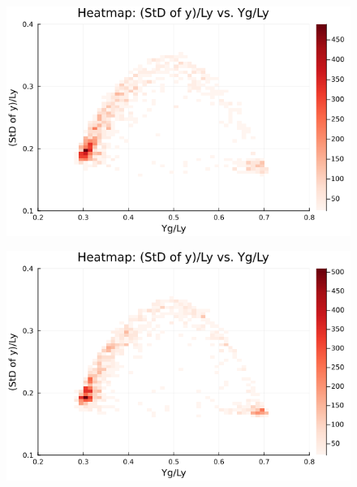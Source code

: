 \begin{figure}[H]
  \centering
  \includegraphics[scale=0.6]{image/RaRtmap10_heat/2023-12-28T12:38:52.075_map_10times_chi1.265_Ay50_rho0.4_T0.43_dT0.04_Rd0.0_Rt0.25_Ra0.938769_g0.0003999718779659611_run4.0e8.png}
  \label{}
\end{figure}

\begin{figure}[H]
  \centering
  \includegraphics[scale=0.6]{image/RaRtmap10_heat/2023-12-28T12:38:52.153_map_10times_chi1.265_Ay50_rho0.4_T0.43_dT0.04_Rd0.0_Rt0.25_Ra1.4081535_g0.0003999718779659611_run4.0e8.png}
  \label{}
\end{figure}

